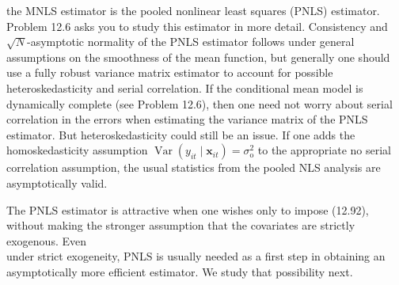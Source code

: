 \documentclass[10pt]{article}
\begin{document}
the MNLS estimator is the pooled nonlinear least squares (PNLS) estimator. Problem 12.6 asks you to study this estimator in more detail. Consistency and $\sqrt{N}$-asymptotic normality of the PNLS estimator follows under general assumptions on the smoothness of the mean function, but generally one should use a fully robust variance matrix estimator to account for possible heteroskedasticity and serial correlation. If the conditional mean model is dynamically complete (see Problem 12.6), then one need not worry about serial correlation in the errors when estimating the variance matrix of the PNLS estimator. But heteroskedasticity could still be an issue. If one adds the homoskedasticity assumption $\operatorname{Var}\left(y_{i t} \mid \mathbf{x}_{i t}\right)=\sigma_{\mathrm{o}}^{2}$ to the appropriate no serial correlation assumption, the usual statistics from the pooled NLS analysis are asymptotically valid.

The PNLS estimator is attractive when one wishes only to impose (12.92), without making the stronger assumption that the covariates are strictly exogenous. Even\\
under strict exogeneity, PNLS is usually needed as a first step in obtaining an asymptotically more efficient estimator. We study that possibility next.
\end{document}
